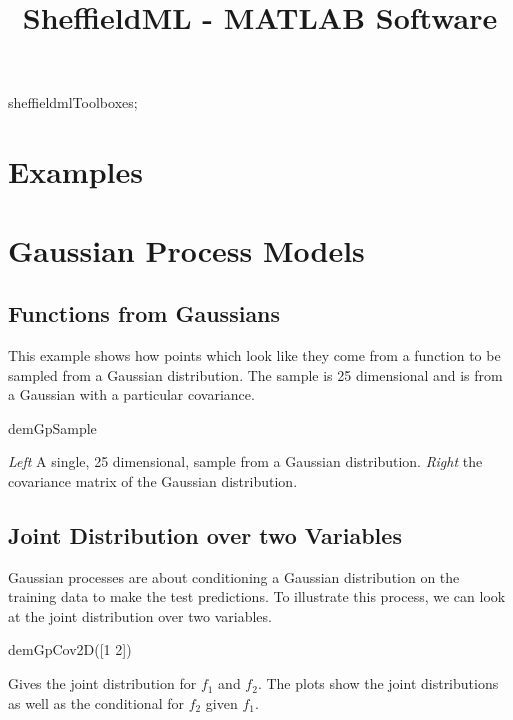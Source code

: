\begin{octave}
sheffieldmlToolboxes;
\end{octave}

\title{SheffieldML - MATLAB Software}


\section{Examples}

\section{Gaussian Process Models}

\subsection{Functions from Gaussians}

This example shows how points which look like they come from a
function to be sampled from a Gaussian distribution. The sample is 25
dimensional and is from a Gaussian with a particular covariance.

\begin{octave}
demGpSample
\end{octave}

\begin{center}
\hfill{}

\emph{Left} A single, 25 dimensional, sample from a Gaussian
distribution. \emph{Right} the covariance matrix of the Gaussian
distribution.

\end{center}


\subsection{Joint Distribution over two Variables}

Gaussian processes are about conditioning a Gaussian distribution
on the training data to make the test predictions. To illustrate this
process, we can look at the joint distribution over two variables.

\begin{octave}
 demGpCov2D([1 2])
\end{octave}

Gives the joint distribution for $f_1$ and
$f_2$. The plots show the joint distributions as well
as the conditional for $f_2$ given
$f_1$.

